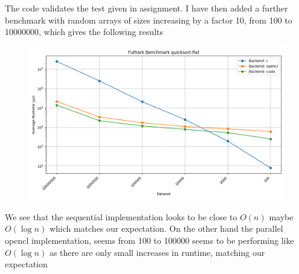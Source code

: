 \documentclass[a4paper,12pt]{article}
\begin{document}
The code validates the test given in assignment. I have then added a
further benchmark with random arrays of sizes increasing by a factor 10,
from 100 to 10000000, which gives the following results
\begin{figure}[htb!]
	\centering
	\includegraphics[width=\linewidth]{quicksort-flatbenchmark_results.png}
\end{figure}
We see that the sequential implementation looks to be close to \(O(n)\)
maybe \(O(\log n)\) which matches our expectation.
On the other hand the parallel opencl implementation, seems from 100 to
100000 seems to be performing like \(O(\log n)\) as there are only small
increases in runtime, matching our expectation
\end{document}
